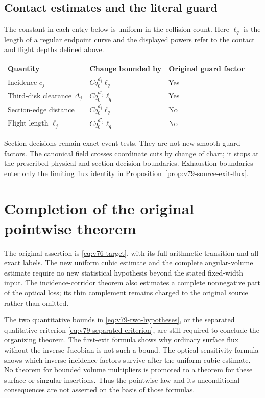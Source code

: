 \documentclass[11pt,reqno]{amsart}
\numberwithin{equation}{section}
\theoremstyle{definition}\newtheorem{definition}[theorem]{Definition}
\theoremstyle{remark}\newtheorem{remark}[theorem]{Remark}
\theoremstyle{definition}\newtheorem{inputstatement}[theorem]{Input statement}
\begin{document}
\subsection{Contact estimates and the literal guard}
The constant in each entry below is uniform in the collision count.
Here $\ell_q$ is the length of a regular endpoint curve and the displayed
powers refer to the contact and flight depths defined above.
\begin{center}
\begin{tabular}{lll}
Quantity & Change bounded by & Original guard factor\\[2pt]
\hline
Incidence $c_j$ & $Cq_0^{d_j}\ell_q$ & Yes\\
Third-disk clearance $\Delta_j$ & $Cq_0^{d'_j}\ell_q$ & Yes\\
Section-edge distance & $Cq_0^{d_j}\ell_q$ & No\\
Flight length $\ell_j$ & $Cq_0^{d'_j}\ell_q$ & No
\end{tabular}
\end{center}
Section decisions remain exact event tests. They are not new smooth
guard factors. The canonical field crosses coordinate cuts by change
of chart; it stops at the prescribed physical and section-decision
boundaries. Exhaustion boundaries enter only the limiting flux identity
in Proposition~\ref{prop:v79-source-exit-flux}.







\section{Completion of the original pointwise theorem}
The original assertion is \eqref{eq:v76-target}, with its full
arithmetic transition and all exact labels. The new uniform cubic
estimate and the complete angular-volume estimate require no new
statistical hypothesis beyond the stated fixed-width input.
The incidence-corridor theorem also estimates a complete nonnegative
part of the optical loss; its thin complement remains charged to the
original source rather than omitted.

The two quantitative bounds in \eqref{eq:v79-two-hypotheses}, or the
separated qualitative criterion \eqref{eq:v79-separated-criterion},
are still required to conclude the organizing theorem. The first-exit
formula shows why ordinary surface flux without the inverse Jacobian
is not such a bound. The optical sensitivity formula shows which
inverse-incidence factors survive after the uniform cubic estimate.
No theorem for bounded volume multipliers is promoted to a theorem for
these surface or singular insertions. Thus the pointwise law and its
unconditional consequences are not asserted on the basis of those formulas.
\end{document}
